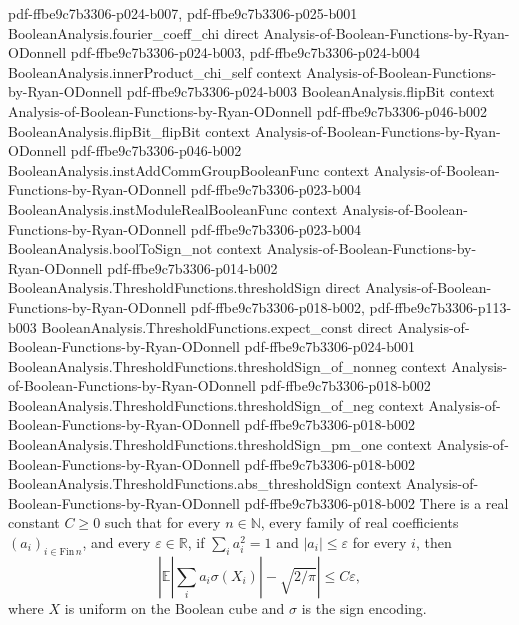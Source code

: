 \begin{theorem}
  {pdf-ffbe9c7b3306-p024-b007,
    pdf-ffbe9c7b3306-p025-b001}
\proofstep
  {BooleanAnalysis.fourier_coeff_chi}
  {direct}
  {Analysis-of-Boolean-Functions-by-Ryan-ODonnell}
  {pdf-ffbe9c7b3306-p024-b003,
    pdf-ffbe9c7b3306-p024-b004}
\proofstep
  {BooleanAnalysis.innerProduct_chi_self}
  {context}
  {Analysis-of-Boolean-Functions-by-Ryan-ODonnell}
  {pdf-ffbe9c7b3306-p024-b003}
\proofstep
  {BooleanAnalysis.flipBit}
  {context}
  {Analysis-of-Boolean-Functions-by-Ryan-ODonnell}
  {pdf-ffbe9c7b3306-p046-b002}
\proofstep
  {BooleanAnalysis.flipBit_flipBit}
  {context}
  {Analysis-of-Boolean-Functions-by-Ryan-ODonnell}
  {pdf-ffbe9c7b3306-p046-b002}
\proofstep
  {BooleanAnalysis.instAddCommGroupBooleanFunc}
  {context}
  {Analysis-of-Boolean-Functions-by-Ryan-ODonnell}
  {pdf-ffbe9c7b3306-p023-b004}
\proofstep
  {BooleanAnalysis.instModuleRealBooleanFunc}
  {context}
  {Analysis-of-Boolean-Functions-by-Ryan-ODonnell}
  {pdf-ffbe9c7b3306-p023-b004}
\proofstep
  {BooleanAnalysis.boolToSign_not}
  {context}
  {Analysis-of-Boolean-Functions-by-Ryan-ODonnell}
  {pdf-ffbe9c7b3306-p014-b002}
\proofstep
  {BooleanAnalysis.ThresholdFunctions.thresholdSign}
  {direct}
  {Analysis-of-Boolean-Functions-by-Ryan-ODonnell}
  {pdf-ffbe9c7b3306-p018-b002,
    pdf-ffbe9c7b3306-p113-b003}
\proofstep
  {BooleanAnalysis.ThresholdFunctions.expect_const}
  {direct}
  {Analysis-of-Boolean-Functions-by-Ryan-ODonnell}
  {pdf-ffbe9c7b3306-p024-b001}
\proofstep
  {BooleanAnalysis.ThresholdFunctions.thresholdSign_of_nonneg}
  {context}
  {Analysis-of-Boolean-Functions-by-Ryan-ODonnell}
  {pdf-ffbe9c7b3306-p018-b002}
\proofstep
  {BooleanAnalysis.ThresholdFunctions.thresholdSign_of_neg}
  {context}
  {Analysis-of-Boolean-Functions-by-Ryan-ODonnell}
  {pdf-ffbe9c7b3306-p018-b002}
\proofstep
  {BooleanAnalysis.ThresholdFunctions.thresholdSign_pm_one}
  {context}
  {Analysis-of-Boolean-Functions-by-Ryan-ODonnell}
  {pdf-ffbe9c7b3306-p018-b002}
\proofstep
  {BooleanAnalysis.ThresholdFunctions.abs_thresholdSign}
  {context}
  {Analysis-of-Boolean-Functions-by-Ryan-ODonnell}
  {pdf-ffbe9c7b3306-p018-b002}
There is a real constant $C\geq0$ such that for every $n\in\mathbb N$, every family of
real coefficients $(a_i)_{i\in\mathrm{Fin}\,n}$, and every $\varepsilon\in\mathbb R$, if
$\sum_i a_i^2=1$ and $|a_i|\leq\varepsilon$ for every $i$, then
\[\left|\mathbb E\left|\sum_i a_i\sigma(X_i)\right|-\sqrt{2/\pi}\right|\leq C\varepsilon,\]
where $X$ is uniform on the Boolean cube and $\sigma$ is the sign encoding.
\end{theorem}

